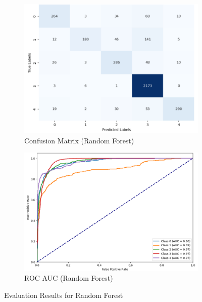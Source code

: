 \vspace{0.25em}

\begin{figure}[h!]
    \centering
    \begin{subfigure}[b]{0.49\textwidth}
        \centering
        \includegraphics[width=\textwidth]{Images/RF Confusion Matrix.png}
        \caption{Confusion Matrix (Random Forest)}
        \label{RFCM}  %
    \end{subfigure}
    \hfill
    \begin{subfigure}[b]{0.49\textwidth}
        \centering
        \includegraphics[width=\textwidth]{Images/RF ROC.png}
        \caption{ROC AUC (Random Forest)}
        \label{RFROC}  %
    \end{subfigure}
    \caption{Evaluation Results for Random Forest}
    \label{fig:rf_comparison}
\end{figure}

